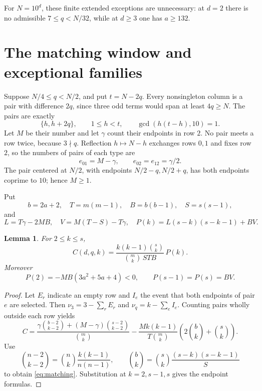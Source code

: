 \documentclass[11pt,a4paper]{article}
\newtheorem{lemma}[theorem]{Lemma}
\theoremstyle{remark}
\numberwithin{equation}{section}
\begin{document}
For \(N=10^d\), these finite extended exceptions are unnecessary:
at \(d=2\) there is no admissible \(7\le q<N/32\), while at
\(d\ge3\) one has \(a\ge132\).

\section{The matching window and exceptional families}\label{sec:matching}
Suppose \(N/4\le q<N/2\), and put \(t=N-2q\).
Every nonsingleton column is a pair with difference \(2q\),
since three odd terms would span at least \(4q\ge N\).
The pairs are exactly
\begin{equation}\label{eq:pairs}
 \{h,h+2q\},\qquad 1\le h<t,\qquad \gcd(h(t-h),10)=1.
\end{equation}
Let \(M\) be their number and let \(\gamma\) count their endpoints
in row \(2\). No pair meets a row twice, because \(3\nmid q\).
Reflection \(h\mapsto N-h\) exchanges rows \(0,1\) and fixes row \(2\),
so the numbers of pairs of each type are
\[
 e_{01}=M-\gamma,\qquad e_{02}=e_{12}=\gamma/2.
\]
The pair centered at \(N/2\), with endpoints \(N/2-q,N/2+q\),
has both endpoints coprime to \(10\); hence \(M\ge1\).

Put
\begin{equation}\label{eq:matchingparams}
 b=2a+2,\quad T=m(m-1),\quad B=b(b-1),\quad S=s(s-1),
\end{equation}
and
\begin{equation}\label{eq:matchingpoly}
 L=T\gamma-2MB,\quad V=M(T-S)-T\gamma,\quad
 P(k)=L(s-k)(s-k-1)+BV.
\end{equation}

\begin{lemma}\label{lem:matching}
For \(2\le k\le s\),
\begin{equation}\label{eq:matching}
 C(d,q,k)=\frac{k(k-1)\binom sk}{\binom mk\,STB}\,P(k).
\end{equation}
Moreover
\[
 P(2)=-MB(3a^2+5a+4)<0,\qquad P(s-1)=P(s)=BV.
\]
\end{lemma}
\begin{proof}
Let \(E_r\) indicate an empty row and \(I_e\) the event that both
endpoints of pair \(e\) are selected.
Then \(\nu_3=3-\sum_r E_r\) and \(\nu_q=k-\sum_e I_e\).
Counting pairs wholly outside each row yields
\[
 C=
 \frac{\gamma\binom{b-2}{k-2}+(M-\gamma)\binom{s-2}{k-2}}{\binom mk}
 -\frac{Mk(k-1)}{T\binom mk}
       \left(2\binom bk+\binom sk\right).
\]
Use
\[
 \binom{n-2}{k-2}=\binom nk\frac{k(k-1)}{n(n-1)},\qquad
 \binom bk=\binom sk\frac{(s-k)(s-k-1)}S
\]
to obtain \eqref{eq:matching}. Substitution at \(k=2,s-1,s\)
gives the endpoint formulas.
\end{proof}
\end{document}
